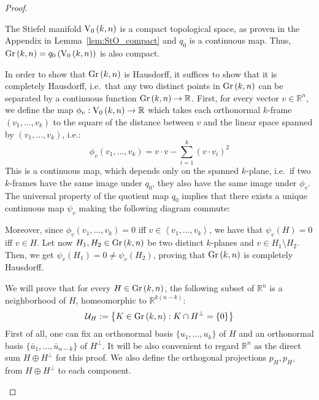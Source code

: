 \begin{proof} \begin{b_item}
\item The Stiefel manifold $\StO{k}{n}$ is a compact topological space, as proven in the Appendix in Lemma~\ref{lem:StO_compact} and $q_0$ is a continuous map. Thus, $\Gr{k}{n}=q_0\left(\StO{k}{n}\right)$ is also compact.
\item In order to show that $\Gr{k}{n}$ is Hausdorff, it suffices to show that it is completely Hausdorff, i.e.\ that any two distinct points in $\Gr{k}{n}$ can be separated by a continuous function $\Gr{k}{n}\to\mathbb{R}$. First, for every vector $v\in\mathbb{R}^n$, we define the map $\phi_v:\StO{k}{n}\to\mathbb{R}$ which takes each orthonormal $k$-frame $(v_1,\ldots,v_k)$ to the square of the distance between $v$ and the linear space spanned by $(v_1,\ldots,v_k)$, i.e.:
\[\phi_v(v_1,\ldots,v_k)=v\cdot v-\sum_{i=1}^k{\left(v\cdot v_i\right)}^2\]
This is a continuous map, which depends only on the spanned $k$-plane, i.e.\ if two $k$-frames have the same image under $q_0$, they also have the same image under $\phi_v$. The universal property of the quotient map $q_0$ implies that there exists a unique continuous map $\psi_v$ making the following diagram commute:

\begin{center}
\end{center}

Moreover, since $\phi_v(v_1,\ldots,v_k)=0$ iff $v\in\left<v_1,\ldots,v_k\right>$, we have that $\psi_v(H)=0$ iff $v\in H$. Let now $H_1,H_2\in\Gr{k}{n}$ be two distinct $k$-planes and $v\in H_1\setminus H_2$. Then, we get $\psi_v(H_1)=0\neq\psi_v(H_2)$, proving that $\Gr{k}{n}$ is completely Hausdorff.


\item We will prove that for every $H\in\Gr{k}{n}$, the following subset of $\mathbb{R}^n$ is a neighborhood of $H$, homeomorphic to $\mathbb{R}^{k(n-k)}$:
\[\mathcal{U}_H:=\left\{K\in\Gr{k}{n}:K\cap H^{\perp}=\{0\}\right\}\]
First of all, one can fix an orthonormal basis $\{u_1,\ldots,u_k\}$ of $H$ and an orthonormal basis $\{\bar{u}_1,\ldots,\bar{u}_{n-k}\}$ of $H^{\perp}$. It will be also convenient to regard $\mathbb{R}^n$ as the direct sum $H\oplus H^{\perp}$ for this proof. We also define the orthogonal projections $p_H,p_{H^{\perp}}$ from $H\oplus H^{\perp}$ to each component.


\end{b_item}
\end{proof}
